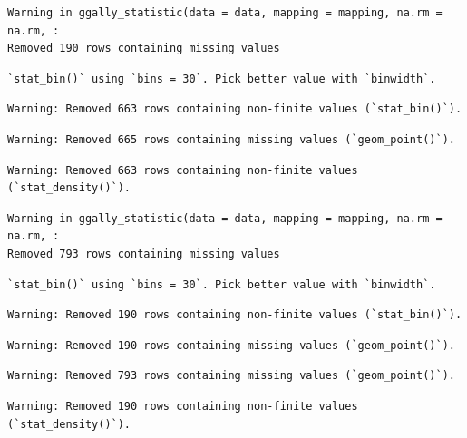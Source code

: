 \documentclass[
  letterpaper,
  DIV=11,
  numbers=noendperiod]{scrartcl}
\begin{document}
\begin{verbatim}
Warning in ggally_statistic(data = data, mapping = mapping, na.rm = na.rm, :
Removed 190 rows containing missing values
\end{verbatim}

\begin{verbatim}
`stat_bin()` using `bins = 30`. Pick better value with `binwidth`.
\end{verbatim}

\begin{verbatim}
Warning: Removed 663 rows containing non-finite values (`stat_bin()`).
\end{verbatim}

\begin{verbatim}
Warning: Removed 665 rows containing missing values (`geom_point()`).
\end{verbatim}

\begin{verbatim}
Warning: Removed 663 rows containing non-finite values (`stat_density()`).
\end{verbatim}

\begin{verbatim}
Warning in ggally_statistic(data = data, mapping = mapping, na.rm = na.rm, :
Removed 793 rows containing missing values
\end{verbatim}

\begin{verbatim}
`stat_bin()` using `bins = 30`. Pick better value with `binwidth`.
\end{verbatim}

\begin{verbatim}
Warning: Removed 190 rows containing non-finite values (`stat_bin()`).
\end{verbatim}

\begin{verbatim}
Warning: Removed 190 rows containing missing values (`geom_point()`).
\end{verbatim}

\begin{verbatim}
Warning: Removed 793 rows containing missing values (`geom_point()`).
\end{verbatim}

\begin{verbatim}
Warning: Removed 190 rows containing non-finite values (`stat_density()`).
\end{verbatim}
\end{document}
